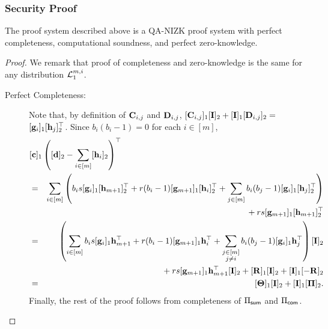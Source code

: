 \subsubsection{Security Proof}
\begin{theorem} \label{theo:bits}
The proof system described above is a QA-NIZK proof system with perfect completeness, computational soundness, and perfect zero-knowledge.
\end{theorem}	
\begin{proof}
We remark that proof of completeness and zero-knowledge is the same for any distribution $\mathcal{L}_1^{m,i}$.
\begin{description}
\item[Perfect Completeness:]
Note that,
by definition of $\mathbf{{C}}_{i,j}$ and $\mathbf{{D}}_{i,j}$, 
$[\mathbf{{C}}_{i,j}]_1[\mathbf{{I}}]_2+[\mathbf{{I}}]_1[\mathbf{{D}}_{i,j}]_2=$
$[\mathbf{g}_{i}]_1[\mathbf{h}_j]_2^\top$.  Since $b_i(b_i-1) = 0$ for each $i\in[m]$,
\begin{eqnarray*}
\lefteqn{
[\vecb{c}]_1\left( [\vecb{d}]_2 - \sum_{i\in[m]} [\vecb{h}_{i}]_2\right)^\top}\\
& = & 
    \sum_{i \in [m]}\left(
        b_i s[\vecb{g}_{i}]_1[\vecb{h}_{m+1}]_2^{\top}+
        r(b_i-1)[\vecb{g}_{m+1}]_1[\vecb{h}_i]_2^{\top}+
        \sum_{j \in [m]} b_i (b_j-1)[\vecb{g}_{i}]_1[\vecb{h}_{j}]_2^{\top}
    \right)
\\ & & \mbox{ }
    + rs[\vecb{g}_{m+1}]_1[\vecb{h}_{m+1}]_2^{\top}\\
& = & 
    \left(\sum_{i\in[m]}b_is[\vecb{g}_{i}]_1\vecb{h}_{m+1}^{\top}+r(b_i-1)[\vecb{g}_{m+1}]_1\vecb{h}_i^{\top}+
        \sum_{\substack{j \in [m]\\j\neq i}}b_i(b_j-1)[\vecb{g}_{i}]_1\vecb{h}_{j}^{\top}\right)[\matr{I}]_2\\
& & \mbox{ }
    +rs[\vecb{g}_{m+1}]_1\vecb{h}_{m+1}^{\top}[\matr{I}]_2
    +[\matr{R}]_1[\matr{I}]_2 + [\matr{I}]_1[-\matr{R}]_2
\\ & = &
    [\matr{\Theta}]_1[\matr{I}]_2+
    [\matr{I}]_1[\matr{\Pi}]_2.
\end{eqnarray*}
Finally, the rest of the proof follows from completeness of $\Pi_{\mathsf{sum}}$ and $\Pi_{\mathsf{com}}$. 


\end{description}
\end{proof}
